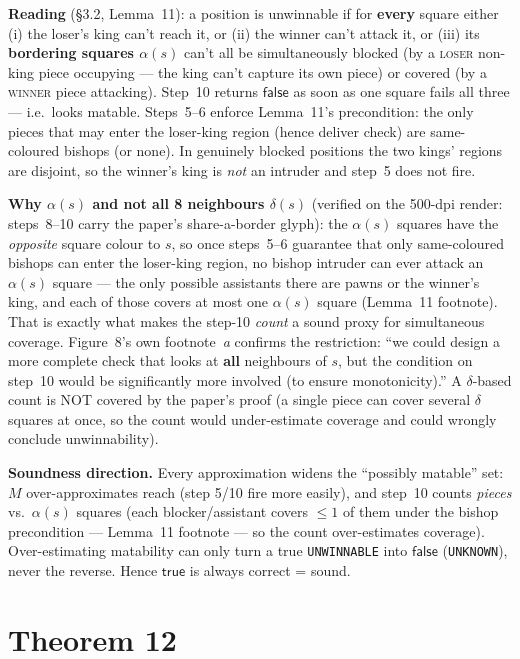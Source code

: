 \documentclass[11pt]{article}
\newcommand{\code}[1]{\texttt{#1}}
\theoremstyle{plain}
\theoremstyle{definition}
\newcommand{\true}{\ensuremath{\mathsf{true}}}
\newcommand{\false}{\ensuremath{\mathsf{false}}}
\begin{document}
\textbf{Reading} (\S3.2, Lemma~11): a position is unwinnable if for \textbf{every} square either (i) the loser's king
can't reach it, or (ii) the winner can't attack it, or (iii) its \textbf{bordering squares $\alpha(s)$} can't all be
simultaneously blocked (by a \textsc{loser} non-king piece occupying --- the king can't capture its own piece) or
covered (by a \textsc{winner} piece attacking). Step~10 returns \false{} as soon as one square fails all three ---
i.e.\ looks matable. Steps~5--6 enforce Lemma~11's precondition: the only pieces that may enter the loser-king region
(hence deliver check) are same-coloured bishops (or none). In genuinely blocked positions the two kings' regions are
disjoint, so the winner's king is \emph{not} an intruder and step~5 does not fire.

\textbf{Why $\alpha(s)$ and not all 8 neighbours $\delta(s)$} (verified on the 500-dpi render: steps~8--10 carry the
paper's share-a-border glyph): the $\alpha(s)$ squares have the \emph{opposite} square colour to
$s$, so once steps~5--6 guarantee that only same-coloured bishops can enter the loser-king region, no bishop intruder
can ever attack an $\alpha(s)$ square --- the only possible assistants there are pawns or the winner's king, and each
of those covers at most one $\alpha(s)$ square (Lemma~11 footnote). That is exactly what makes the step-10
\emph{count} a sound proxy for simultaneous coverage. Figure~8's own footnote~\emph{a} confirms the restriction:
``we could design a more complete check that looks at \textbf{all} neighbours of $s$, but the condition on step~10
would be significantly more involved (to ensure monotonicity).'' A $\delta$-based count is NOT covered by the paper's
proof (a single piece can cover several $\delta$ squares at once, so the count would under-estimate coverage and could
wrongly conclude unwinnability).

\textbf{Soundness direction.} Every approximation widens the ``possibly matable'' set: $M$ over-approximates reach
(step 5/10 fire more easily), and step~10 counts \emph{pieces} vs.\ $\alpha(s)$ squares (each blocker/assistant covers
$\le 1$ of them under the bishop precondition --- Lemma~11 footnote --- so the count over-estimates coverage).
Over-estimating matability can only turn a true \code{UNWINNABLE} into \false{} (\code{UNKNOWN}), never the reverse.
Hence \true{} is always correct = sound.

\section{Theorem 12}
\end{document}
